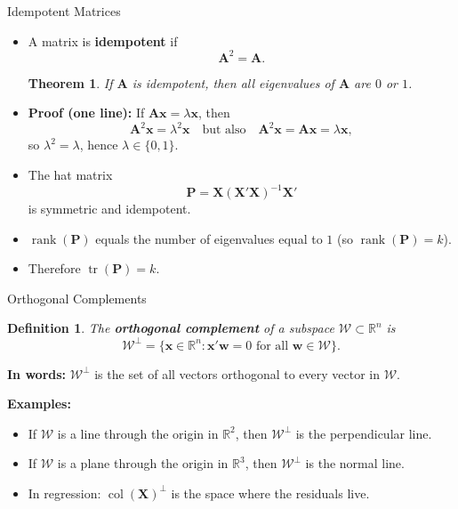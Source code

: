 \documentclass[aspectratio=169, handout, t]{beamer}
\DeclareMathOperator{\tr}{tr}
\DeclareMathOperator{\rank}{rank}
\DeclareMathOperator{\col}{col}
\newtheorem{thm}{Theorem}
\newtheorem{defn}{Definition}
\numberwithin{equation}{section}
\begin{document}
\begin{frame}{Idempotent Matrices}

\begin{itemize}
\item A matrix is \textbf{idempotent} if
\[
\bm{A}^2=\bm{A}.
\]

\begin{thm}
If $\bm{A}$ is idempotent, then all eigenvalues of $\bm{A}$ are $0$ or $1$.
\end{thm}\pause

\item \textbf{Proof (one line):} If $\bm{A}\bm{x}=\lambda \bm{x}$, then
\[
\bm{A}^2\bm{x}=\lambda^2\bm{x}
\quad\text{but also}\quad
\bm{A}^2\bm{x}=\bm{A}\bm{x}=\lambda\bm{x},
\]
so $\lambda^2=\lambda$, hence $\lambda\in\{0,1\}$.\pause

\item The hat matrix
\[
\bm{P}=\bm{X}(\bm{X}'\bm{X})^{-1}\bm{X}'
\]
is symmetric and idempotent.\pause

\item $\rank(\bm{P})$ equals the number of eigenvalues equal to $1$ (so $\rank(\bm{P})=k$).\pause
\item Therefore $\tr(\bm{P})=k$.
\end{itemize}

\end{frame}

\begin{frame}{Orthogonal Complements}

\begin{defn}
The \textbf{orthogonal complement} of a subspace $\mathcal{W}\subset \mathbb{R}^n$ is
\[
\mathcal{W}^{\perp}
=\{\bm{x}\in \mathbb{R}^n:\bm{x}'\bm{w}=0 \text{ for all }\bm{w}\in \mathcal{W}\}.
\]
\end{defn}\pause

\vspace{0.3cm}

\textbf{In words:} $\mathcal{W}^{\perp}$ is the set of all vectors orthogonal to every vector in $\mathcal{W}$.

\vspace{0.3cm}\pause

\textbf{Examples:}
\begin{itemize}
    \item If $\mathcal{W}$ is a line through the origin in $\mathbb{R}^2$, then $\mathcal{W}^{\perp}$ is the perpendicular line.
    \item If $\mathcal{W}$ is a plane through the origin in $\mathbb{R}^3$, then $\mathcal{W}^{\perp}$ is the normal line.
    \item In regression: $\col(\bm{X})^{\perp}$ is the space where the residuals live.
\end{itemize}

\end{frame}
\end{document}
